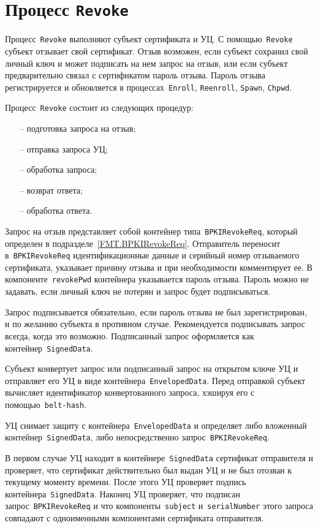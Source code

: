 \section{Процесс \texttt{Revoke}}\label{PROCESSES.Revoke}

Процесс~\texttt{Revoke} выполняют субъект сертификата и УЦ. 
С помощью~\texttt{Revoke} субъект отзывает свой сертификат.
Отзыв возможен, если субъект сохранил свой личный ключ и может подписать 
на нем запрос на отзыв, или если субъект предварительно связал с 
сертификатом пароль отзыва. Пароль отзыва регистрируется и обновляется
в процессах~\texttt{Enroll}, \texttt{Reenroll}, \texttt{Spawn}, 
\texttt{Chpwd}.

Процесс~\texttt{Revoke} состоит из следующих процедур:
\begin{itemize}
\item[--]
подготовка запроса на отзыв;
\item[--]
отправка запроса УЦ;
\item[--]
обработка запроса;
\item[--]
возврат ответа;
\item[--]
обработка ответа.
\end{itemize}

Запрос на отзыв представляет собой контейнер типа~\texttt{BPKIRevokeReq},
который определен в подразделе~\ref{FMT.BPKIRevokeReq}.
Отправитель переносит в~\texttt{BPKIRevokeReq}
идентификационные данные и серийный номер отзываемого сертификата,
указывает причину отзыва и при необходимости комментирует ее.
В компоненте~\texttt{revokePwd} контейнера указывается пароль отзыва.
Пароль можно не задавать, если личный ключ не потерян и запрос будет
подписываться. 

Запрос подписывается обязательно, если пароль отзыва не был 
зарегистрирован, и по желанию субъекта в противном случае.
%
Рекомендуется подписывать запрос всегда, когда это возможно.
%
Подписанный запрос оформляется как контейнер~\texttt{SignedData}.

Субъект конвертует запрос или подписанный запрос на открытом ключе УЦ
и отправляет его УЦ в виде контейнера~\texttt{EnvelopedData}.
Перед отправкой субъект вычисляет идентификатор конвертованного запроса,
хэшируя его с помощью~\texttt{belt-hash}.

УЦ снимает защиту с контейнера~\texttt{EnvelopedData} и определяет 
либо вложенный контейнер~\texttt{SignedData}, либо непосредственно
запрос~\texttt{BPKIRevokeReq}.

В первом случае УЦ находит в контейнере~\texttt{SignedData}
сертификат отправителя и проверяет, что сертификат действительно 
был выдан УЦ и не был отозван к текущему моменту времени. 
После этого УЦ проверяет подпись контейнера~\texttt{SignedData}. 
Наконец УЦ проверяет, что  подписан запрос~\texttt{BPKIRevokeReq} и что 
компоненты~\texttt{subject} и~\texttt{serialNumber} этого запроса 
совпадают с одноименными компонентами сертификата отправителя.

